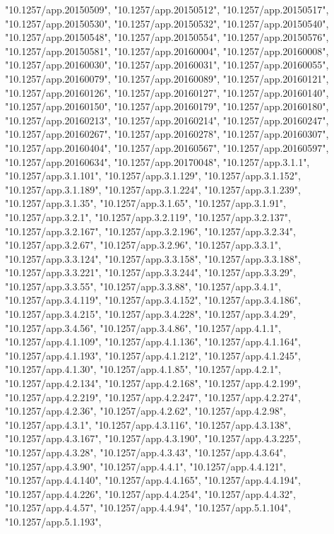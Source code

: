 \documentclass[]{article}
\begin{document}
\begin{itemize}
  "10.1257/app.20150509", "10.1257/app.20150512",
  "10.1257/app.20150517", "10.1257/app.20150530",
  "10.1257/app.20150532", "10.1257/app.20150540",
  "10.1257/app.20150548", "10.1257/app.20150554",
  "10.1257/app.20150576", "10.1257/app.20150581",
  "10.1257/app.20160004", "10.1257/app.20160008",
  "10.1257/app.20160030", "10.1257/app.20160031",
  "10.1257/app.20160055", "10.1257/app.20160079",
  "10.1257/app.20160089", "10.1257/app.20160121",
  "10.1257/app.20160126", "10.1257/app.20160127",
  "10.1257/app.20160140", "10.1257/app.20160150",
  "10.1257/app.20160179", "10.1257/app.20160180",
  "10.1257/app.20160213", "10.1257/app.20160214",
  "10.1257/app.20160247", "10.1257/app.20160267",
  "10.1257/app.20160278", "10.1257/app.20160307",
  "10.1257/app.20160404", "10.1257/app.20160567",
  "10.1257/app.20160597", "10.1257/app.20160634",
  "10.1257/app.20170048", "10.1257/app.3.1.1", "10.1257/app.3.1.101",
  "10.1257/app.3.1.129", "10.1257/app.3.1.152", "10.1257/app.3.1.189",
  "10.1257/app.3.1.224", "10.1257/app.3.1.239", "10.1257/app.3.1.35",
  "10.1257/app.3.1.65", "10.1257/app.3.1.91", "10.1257/app.3.2.1",
  "10.1257/app.3.2.119", "10.1257/app.3.2.137", "10.1257/app.3.2.167",
  "10.1257/app.3.2.196", "10.1257/app.3.2.34", "10.1257/app.3.2.67",
  "10.1257/app.3.2.96", "10.1257/app.3.3.1", "10.1257/app.3.3.124",
  "10.1257/app.3.3.158", "10.1257/app.3.3.188", "10.1257/app.3.3.221",
  "10.1257/app.3.3.244", "10.1257/app.3.3.29", "10.1257/app.3.3.55",
  "10.1257/app.3.3.88", "10.1257/app.3.4.1", "10.1257/app.3.4.119",
  "10.1257/app.3.4.152", "10.1257/app.3.4.186", "10.1257/app.3.4.215",
  "10.1257/app.3.4.228", "10.1257/app.3.4.29", "10.1257/app.3.4.56",
  "10.1257/app.3.4.86", "10.1257/app.4.1.1", "10.1257/app.4.1.109",
  "10.1257/app.4.1.136", "10.1257/app.4.1.164", "10.1257/app.4.1.193",
  "10.1257/app.4.1.212", "10.1257/app.4.1.245", "10.1257/app.4.1.30",
  "10.1257/app.4.1.85", "10.1257/app.4.2.1", "10.1257/app.4.2.134",
  "10.1257/app.4.2.168", "10.1257/app.4.2.199", "10.1257/app.4.2.219",
  "10.1257/app.4.2.247", "10.1257/app.4.2.274", "10.1257/app.4.2.36",
  "10.1257/app.4.2.62", "10.1257/app.4.2.98", "10.1257/app.4.3.1",
  "10.1257/app.4.3.116", "10.1257/app.4.3.138", "10.1257/app.4.3.167",
  "10.1257/app.4.3.190", "10.1257/app.4.3.225", "10.1257/app.4.3.28",
  "10.1257/app.4.3.43", "10.1257/app.4.3.64", "10.1257/app.4.3.90",
  "10.1257/app.4.4.1", "10.1257/app.4.4.121", "10.1257/app.4.4.140",
  "10.1257/app.4.4.165", "10.1257/app.4.4.194", "10.1257/app.4.4.226",
  "10.1257/app.4.4.254", "10.1257/app.4.4.32", "10.1257/app.4.4.57",
  "10.1257/app.4.4.94", "10.1257/app.5.1.104", "10.1257/app.5.1.193",

\end{itemize}
\end{document}

